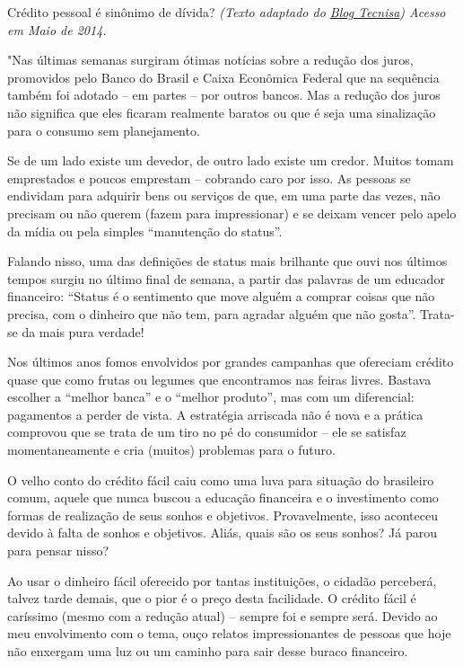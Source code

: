 \begin{task}{Crédito pessoal é sinônimo de dívida?}
\label{fin-ativ-28}
\textit{(Texto adaptado do \href{http://www.blogtecnisa.com.br/mercado/credito-pessoal-e-sinonimo-de-divida/}{Blog Tecnisa}) Acesso em Maio de 2014.}

"Nas últimas semanas surgiram ótimas notícias sobre a redução dos juros, promovidos pelo Banco do Brasil e Caixa Econômica Federal que na sequência também foi adotado – em partes – por outros bancos. Mas a redução dos juros não significa que eles ficaram realmente baratos ou que é seja uma sinalização para o consumo sem planejamento.

Se de um lado existe um devedor, de outro lado existe um credor. Muitos tomam emprestados e poucos emprestam – cobrando caro por isso. As pessoas se endividam para adquirir bens ou serviços de que, em uma parte das vezes, não precisam ou não querem (fazem para impressionar) e se deixam vencer pelo apelo da mídia ou pela simples “manutenção do status”.

Falando nisso, uma das definições de status mais brilhante que ouvi nos últimos tempos surgiu no último final de semana, a partir das palavras de um educador financeiro: “Status é o sentimento que move alguém a comprar coisas que não precisa, com o dinheiro que não tem, para agradar alguém que não gosta”. Trata-se da mais pura verdade!

Nos últimos anos fomos envolvidos por grandes campanhas que ofereciam crédito quase que como frutas ou legumes que encontramos nas feiras livres. Bastava escolher a “melhor banca” e o “melhor produto”, mas com um diferencial: pagamentos a perder de vista. A estratégia arriscada não é nova e a prática comprovou que se trata de um tiro no pé do consumidor – ele se satisfaz momentaneamente e cria (muitos) problemas para o futuro.

O velho conto do crédito fácil caiu como uma luva para situação do brasileiro comum, aquele que nunca buscou a educação financeira e o investimento como formas de realização de seus sonhos e objetivos. Provavelmente, isso aconteceu devido à falta de sonhos e objetivos. Aliás, quais são os seus sonhos? Já parou para pensar nisso?

Ao usar o dinheiro fácil oferecido por tantas instituições, o cidadão perceberá, talvez tarde demais, que o pior é o preço desta facilidade. O crédito fácil é caríssimo (mesmo com a redução atual) – sempre foi e sempre será. Devido ao meu envolvimento com o tema, ouço relatos impressionantes de pessoas que hoje não enxergam uma luz ou um caminho para sair desse buraco financeiro.


\end{task}
